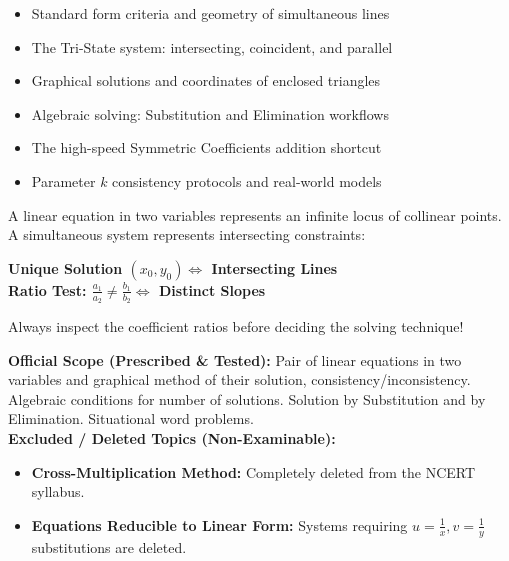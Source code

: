 \documentclass[10pt,a4paper]{article}
\begin{document}
\vspace{3mm}
\begin{minipage}[t]{0.48\textwidth}
  \begin{conceptBox}[title=What This Handbook Includes,fonttitle=\bfseries\color{navy}]
    \begin{itemize}
      \item Standard form criteria and geometry of simultaneous lines
      \item The Tri-State system: intersecting, coincident, and parallel
      \item Graphical solutions and coordinates of enclosed triangles
      \item Algebraic solving: Substitution and Elimination workflows
      \item The high-speed Symmetric Coefficients addition shortcut
      \item Parameter $k$ consistency protocols and real-world models
    \end{itemize}
  \end{conceptBox}
\end{minipage}\hfill
\begin{minipage}[t]{0.48\textwidth}
  \begin{formulaBox}[title=Pedagogical Strategy: Foundations First,fonttitle=\bfseries\color{navy}]
    \raggedright A linear equation in two variables represents an infinite locus of collinear points. A simultaneous system represents intersecting constraints:
    \begin{center}
      \small\textbf{\color{navy}Unique Solution $(x_0, y_0) \iff$ Intersecting Lines}\\[2pt]
      \small\textbf{\color{navy}Ratio Test: $\frac{a_1}{a_2} \neq \frac{b_1}{b_2} \iff$ Distinct Slopes}
    \end{center}
    Always inspect the coefficient ratios before deciding the solving technique!
  \end{formulaBox}
\end{minipage}

\vspace{1.5mm}
\begin{warningBox}[title=CBSE 2026--27 Curriculum Verification \& Rationalized Scope,fonttitle=\bfseries\color{navy}]
  \textbf{Official Scope (Prescribed \& Tested):} Pair of linear equations in two variables and graphical method of their solution, consistency/inconsistency. Algebraic conditions for number of solutions. Solution by Substitution and by Elimination. Situational word problems.\\
  \textbf{Excluded / Deleted Topics (Non-Examinable):}
  \begin{itemize}
    \item \textbf{Cross-Multiplication Method:} Completely deleted from the NCERT syllabus.
    \item \textbf{Equations Reducible to Linear Form:} Systems requiring $u = \frac{1}{x}, v = \frac{1}{y}$ substitutions are deleted.
  \end{itemize}
\end{warningBox}
\end{document}
